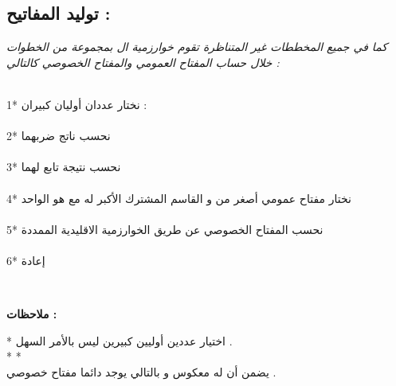 \documentclass[11pt,a4paper]{report}
\begin{document}
\begin{otherlanguage}{arabic}
\chapter{توليد المفاتيح :}
\begin{otherlanguage}{arabic}
\begin{center}
\begin{flushleft}
\textit{كما في جميع المخططات غير المتناظرة تقوم خوارزمية ال  بمجموعة من الخطوات خلال حساب المفتاح العمومي والمفتاح الخصوصي كالتالي :}
\end{flushleft}
\\
1* نختار عددان أوليان كبيران :
\\
\textit{}
\\
2*  نحسب ناتج ضربهما 
\\
\textit{}
\\
3*  نحسب نتيجة تابع \textLR{\phi} لهما 
\\
\textit{}
\\
4* نختار مفتاح عمومي  أصغر من \textLR{\phi} و القاسم المشترك الأكبر له مع \textLR{\phi} هو الواحد 
\\
\textit{}
\\
5* نحسب المفتاح الخصوصي عن طريق الخوارزمية الاقليدية الممددة
\\
\textit{}
\\
6*  إعادة
\\
\textit{}

\\
\begin{flushleft}
\textbf{ملاحظات :}
\end{flushleft}
\begin{flushleft}
* اختيار عددين أوليين كبيرين 
ليس بالأمر السهل .
\\ *
*  \textit{} 
\\
يضمن أن  له معكوس و بالتالي يوجد دائما مفتاح خصوصي   .
\end{flushleft}












\end{center}
\end{otherlanguage}

\end{otherlanguage}
\end{document}

